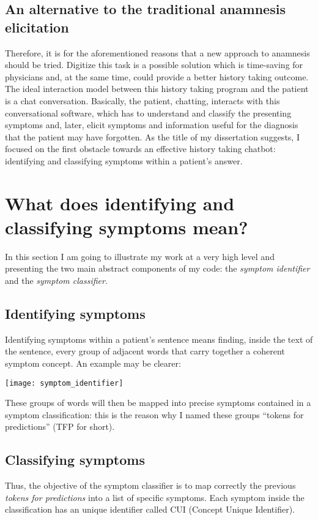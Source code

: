 \subsection{An alternative to the traditional anamnesis elicitation}

Therefore, it is for the aforementioned reasons that a new approach to anamnesis should be tried. Digitize this task is a possible solution which is time-saving for physicians and, at the same time, could provide a better history taking outcome. The ideal interaction model between this history taking program and the patient is a chat conversation. Basically, the patient, chatting, interacts with this conversational software, which has to understand and classify the presenting symptoms and, later, elicit symptoms and information useful for the diagnosis that the patient may have forgotten. As the title of my dissertation suggests, I focused on the first obstacle towards an effective history taking chatbot: identifying and classifying symptoms within a patient’s answer.

\section{What does identifying and classifying symptoms mean?}

In this section I am going to illustrate my work at a very high level and presenting the two main abstract components of my code: the \textit{symptom identifier} and the \textit{symptom classifier}. 

\label{sec:identifying_classifying}
\subsection{Identifying symptoms}

Identifying symptoms within a patient's sentence means finding, inside the text of the sentence, every group of adjacent words that carry together a coherent symptom concept. An example may be clearer:

\begin{center}
  \texttt{[image: symptom\_identifier]}
\end{center}

These groups of words will then be mapped into precise symptoms contained in a symptom classification: this is the reason why I named these groups “tokens for predictions” (TFP for short).

\subsection{Classifying symptoms}
Thus, the objective of the symptom classifier is to map correctly the previous \textit{tokens for predictions} into a list of specific symptoms. Each symptom inside the classification has an unique identifier called CUI (Concept Unique Identifier).

